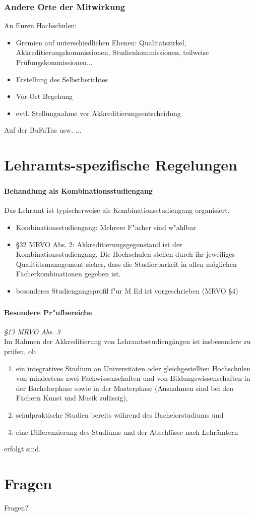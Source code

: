 \documentclass{beamer}
\begin{document}
\begin{frame}
\frametitle{Andere Orte der Mitwirkung}
An Euren Hochschulen:
\begin{itemize}
\item Gremien auf unterschiedlichen Ebenen: Qualitätszirkel, Akkreditierungskommissionen, Studienkommissionen, teilweise Prüfungskommissionen...
\item Erstellung des Selbstberichtes
\item Vor-Ort Begehung
\item evtl. Stellungnahme vor Akkreditierungsentscheidung
\end{itemize}
\vspace*{0.5cm}
Auf der BuFaTas usw. ...
\end{frame}
\section{Lehramts-\glqq spezifische\grqq\xspace Regelungen}

\begin{frame}
\frametitle{\insertsection}
\framesubtitle{Behandlung als Kombinationsstudiengang}
Das Lehramt ist typischerweise als Kombinationsstudiengang organisiert.
\begin{itemize}
	\item Kombinationsstudiengang: Mehrere F"acher sind w"ahlbar
	\item \S 32 MRVO Abs. 2: Akkreditierungsgegenstand ist der Kombinationsstudiengang. Die Hochschulen stellen durch ihr jeweiliges Qualitätsmanagement sicher, dass die Studierbarkeit in allen möglichen Fächerkombinationen gegeben ist. 
	\item besonderes Studiengangsprofil f"ur M Ed ist vorgeschrieben (MRVO \S 4)
\end{itemize}
\end{frame}

\begin{frame}
\frametitle{\insertsection}
\framesubtitle{Besondere Pr"ufbereiche}
\textit{\S 13 MRVO Abs. 3}\\\vspace*{.5cm}
Im Rahmen der Akkreditierung von Lehramtsstudiengängen ist 
insbesondere zu prüfen, ob 
\begin{enumerate}
\item   ein integratives Studium an Universitäten oder gleichgestellten Hochschulen von mindestens zwei Fachwissenschaften und von Bildungswissenschaften in der Bachelorphase sowie  in der Masterphase (Ausnahmen sind bei den Fächern Kunst und Musik zulässig), 
\item schulpraktische Studien bereits während des Bachelorstudiums und 
\item eine Differenzierung des Studiums und der Abschlüsse nach Lehrämtern
\end{enumerate}
 
erfolgt  sind. 
\end{frame}

\section*{Fragen}
\begin{frame}
\centering
\Large{ Fragen?}
\end{frame}
\end{document}

